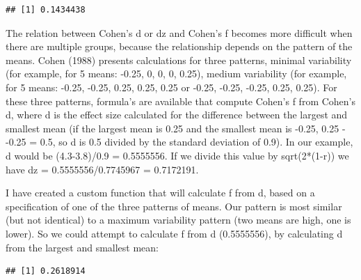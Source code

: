 \documentclass[]{article}
\newenvironment{Shaded}{\begin{snugshade}}{\end{snugshade}}
\newcommand{\KeywordTok}[1]{\textcolor[rgb]{0.13,0.29,0.53}{\textbf{#1}}}
\newcommand{\DataTypeTok}[1]{\textcolor[rgb]{0.13,0.29,0.53}{#1}}
\newcommand{\StringTok}[1]{\textcolor[rgb]{0.31,0.60,0.02}{#1}}
\newcommand{\OperatorTok}[1]{\textcolor[rgb]{0.81,0.36,0.00}{\textbf{#1}}}
\newcommand{\NormalTok}[1]{#1}
\begin{document}
\begin{verbatim}
## [1] 0.1434438
\end{verbatim}

The relation between Cohen's d or dz and Cohen's f becomes more
difficult when there are multiple groups, because the relationship
depends on the pattern of the means. Cohen (1988) presents calculations
for three patterns, minimal variability (for example, for 5 means:
-0.25, 0, 0, 0, 0.25), medium variability (for example, for 5 means:
-0.25, -0.25, 0.25, 0.25, 0.25 or -0.25, -0.25, -0.25, 0.25, 0.25). For
these three patterns, formula's are available that compute Cohen's f
from Cohen's d, where d is the effect size calculated for the difference
between the largest and smallest mean (if the largest mean is 0.25 and
the smallest mean is -0.25, 0.25 - -0.25 = 0.5, so d is 0.5 divided by
the standard deviation of 0.9). In our example, d would be (4.3-3.8)/0.9
= 0.5555556. If we divide this value by sqrt(2*(1-r)) we have dz =
0.5555556/0.7745967 = 0.7172191.

I have created a custom function that will calculate f from d, based on
a specification of one of the three patterns of means. Our pattern is
most similar (but not identical) to a maximum variability pattern (two
means are high, one is lower). So we could attempt to calculate f from d
(0.5555556), by calculating d from the largest and smallest mean:

\begin{Shaded}
\end{Shaded}

\begin{verbatim}
## [1] 0.2618914
\end{verbatim}

\begin{Shaded}
\end{Shaded}
\end{document}
